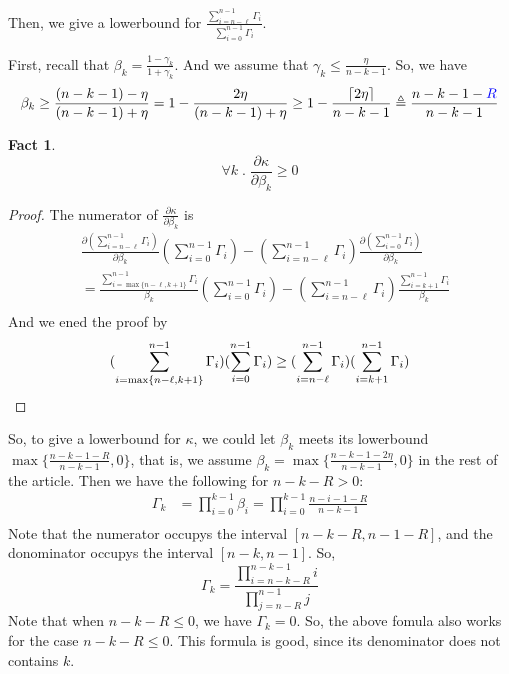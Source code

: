 \documentclass{article}
\newtheorem{fact}{Fact}[section]
\begin{document}
Then, we give a lowerbound for $\frac{\sum_{i=n-\ell}^{n-1}\Gamma_i}{\sum_{i=0}^{n-1}\Gamma_i}$.

First, recall that $\beta_k = \frac{1 - \gamma_k}{1 + \gamma_k}$.
And we assume that $\gamma_k \leq \frac{\eta}{n - k - 1}$.
So, we have
\[\beta_k \geq \frac{(n - k - 1) - \eta}{(n - k - 1) + \eta} = 1 - \frac{2\eta}{(n - k - 1) + \eta} \geq 1 - \frac{\lceil2\eta\rceil}{n - k - 1} \triangleq \frac{n - k - 1 - \textcolor{blue}{R}}{n - k - 1}\]

\begin{fact}
  \[\forall k \;.\; \frac{\partial \kappa}{\partial \beta_k} \geq 0\]
\end{fact}
\begin{proof}
  The numerator of $\frac{\partial \kappa}{\partial \beta_k}$ is
  \begin{align*}
    &\frac{\partial (\sum_{i=n-\ell}^{n-1} \Gamma_i)}{\partial \beta_k} (\sum_{i=0}^{n-1}\Gamma_i) - (\sum_{i=n-\ell}^{n-1}\Gamma_i)\frac{\partial (\sum_{i=0}^{n-1}\Gamma_i)}{\partial \beta_k}\\
    &= \frac{\sum_{i=\max\{n-\ell,k+1\}}^{n-1} \Gamma_i}{\beta_k} (\sum_{i=0}^{n-1}\Gamma_i) - (\sum_{i=n-\ell}^{n-1}\Gamma_i)\frac{\sum_{i=k+1}^{n-1}\Gamma_i}{\beta_k}\\
  \end{align*}
  And we ened the proof by
   \[(\sum_{i=\max\{n-\ell,k+1\}}^{n-1} \Gamma_i) (\sum_{i=0}^{n-1}\Gamma_i) \geq (\sum_{i=n-\ell}^{n-1}\Gamma_i)(\sum_{i=k+1}^{n-1}\Gamma_i) \qedhere\]
\end{proof}

So, to give a lowerbound for $\kappa$, we could let $\beta_k$ meets its lowerbound $\max\{\frac{n - k - 1 - R}{n - k - 1}, 0\}$, that is, we assume $\beta_k = \max\{\frac{n - k - 1 - 2\eta}{n - k - 1}, 0\}$ in the rest of the article.
Then we have the following for $n - k - R > 0$:
\begin{align*}
  \Gamma_k
  &= \prod_{i=0}^{k-1}\beta_i  = \prod_{i=0}^{k-1}\frac{n - i - 1 - R}{n - k - 1}\\
\end{align*}
Note that the numerator occupys the interval $[n - k - R, n - 1 - R]$, and the donominator occupys the interval $[n - k, n-1]$.
So,
\[\Gamma_k = \frac{\prod_{i=n-k-R}^{n-k-1} i}{\prod_{j=n-R}^{n-1}j}\]
Note that when $n - k - R \leq 0$, we have $\Gamma_k = 0$.
So, the above fomula also works for the case $n - k - R \leq 0$.
This formula is good, since its denominator does not contains $k$.
\end{document}
